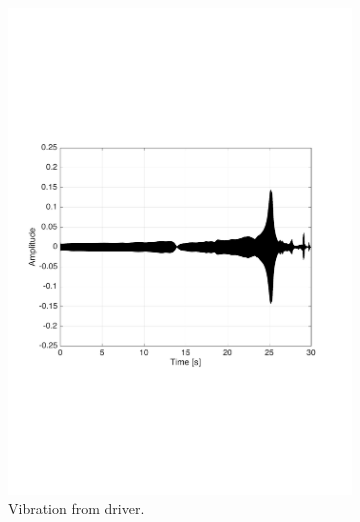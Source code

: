 \begin{figure}[H]
\centering
\begin{subfigure}[t]{0.335\textwidth}
	\includegraphics[width=1\textwidth]{figures/raw_driver14.pdf}
	\caption{Vibration from driver.}
	\label{fig:raw_driver14}
\end{subfigure}
\begin{subfigure}[t]{0.3\textwidth}

\end{subfigure}
\end{figure}
